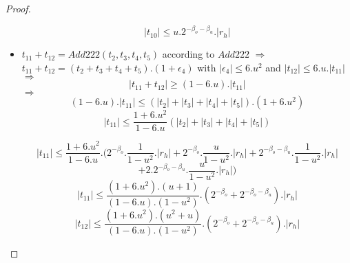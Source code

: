 \begin{proof}
\begin{itemize}
    $$\lvert t_{10} \rvert \le u.2^{-\beta_o -\beta_u}. \lvert r_h \rvert$$ 
    \item $t_{11} + t_{12} = Add222(t_2, t_3, t_4, t_5)$ according to $Add222$ $\Rightarrow$ $t_{11} + t_{12} = (t_2+ t_3 + t_4 + t_5).(1 + \epsilon_4)$ with $\lvert \epsilon_4 \rvert \le 6.u^2$ and $\lvert t_{12} \rvert \le 6.u.\lvert t_{11} \rvert$ $\Rightarrow$
    $$\lvert t_{11} + t_{12} \rvert \ge (1 - 6.u). \lvert t_{11} \rvert$$
    $\Rightarrow$
    $$(1 - 6.u). \lvert t_{11} \rvert \le (\lvert t_2 \rvert + \lvert t_3 \rvert + \lvert t_4 \rvert + \lvert t_5 \rvert).(1 + 6.u^2)$$
    $$\lvert t_{11} \rvert \le \frac{1 + 6.u^2}{1 - 6.u}(\lvert t_2 \rvert + \lvert t_3 \rvert + \lvert t_4 \rvert + \lvert t_5 \rvert)$$
    
    $$\lvert t_{11} \rvert \le \frac{1 + 6.u^2}{1 - 6.u}.(2^{-\beta_o}. \frac{1}{1-u^2}. \lvert r_h \rvert + 2^{-\beta_o}. \frac{u}{1-u^2}. \lvert r_h \rvert + 2^{-\beta_o -\beta_u}. \frac{1}{1-u^2}. \lvert r_h \rvert$$ 
    $$+ 2.2^{-\beta_o -\beta_u}. \frac{u}{1-u^2}. \lvert r_h \rvert)$$
    $$\lvert t_{11} \rvert \le \frac{(1 + 6.u^2).(u+1)}{(1 - 6.u).(1-u^2)}.(2^{-\beta_o} + 2^{-\beta_o -\beta_u}). \lvert r_h \rvert $$
    $$\lvert t_{12} \rvert \le \frac{(1 + 6.u^2).(u^2+u)}{(1 - 6.u).(1-u^2)}.(2^{-\beta_o} + 2^{-\beta_o -\beta_u}). \lvert r_h \rvert $$
    

\end{itemize}
\end{proof}
